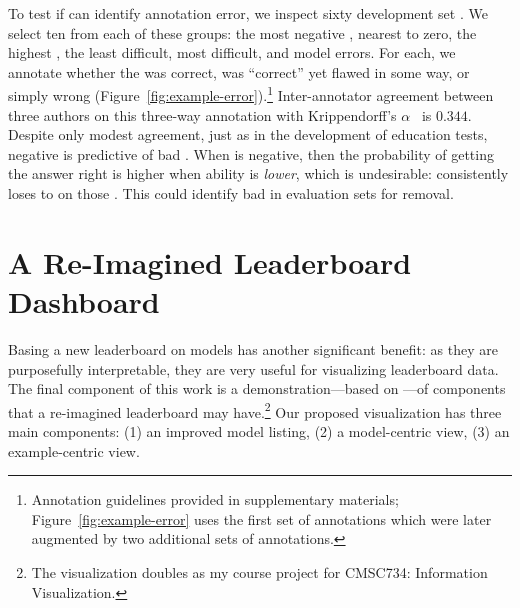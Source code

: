 To test if \irt{} can identify annotation error, we inspect sixty \squad{} development set \itms{}.
We select ten \itms{} from each of these groups: the most negative \discability{}, \discability{} nearest to zero, the highest \discability{}, the least difficult, most difficult, and \irt{} model errors.
For each, we annotate whether the \itm{} was correct, was ``correct'' yet flawed in some way, or simply wrong (Figure~\ref{fig:example-error}).\footnote{
    Annotation guidelines provided in supplementary materials; Figure~\ref{fig:example-error} uses the first set of annotations which were later augmented by two additional sets of annotations.
}
Inter-annotator agreement between three authors on this three-way annotation with Krippendorff's $\alpha$~\citep{kripp2004,artstein2008inter} is $0.344$.
Despite only modest agreement, just as in the development of education tests, negative \discability{} is predictive of bad \itms{}.
When \discability{} is negative, then the probability of getting
the answer right is higher when ability is \emph{lower}, which is
undesirable: \smart{} consistently loses to \dumb{} on those \itms{}.
This could identify bad \itms{} in evaluation sets for removal.
\begin{figure*}[t]
    \centering
    \caption{
        We annotate \squad{} \itms{} by \discability{}, \diff{}, and \irt{} prediction errors.
        For example, one question with negative \discability{} was classified as ``Wrong'' with the explanation that the annotated answer indicates it is  answerable, but the question actually  answerable.
        \Itms{} with negative \discability{} or where \irt{}'s prediction is wrong have a much higher rate of annotation error (``Flawed'' or ``Wrong'').
        Using similar methodology, errors in datasets could be more rapidly identified.
    }
    \label{fig:example-error}
\end{figure*}
\section{A Re-Imagined Leaderboard Dashboard}
\label{ch:isicle:vis}

Basing a new leaderboard on \irt{} models has another significant benefit: as they are purposefully interpretable, they are very useful for visualizing leaderboard data.
The final component of this work is a demonstration---based on \squad{}---of components that a re-imagined leaderboard may have.\footnote{
    The visualization doubles as my course project for CMSC734: Information Visualization.
}
Our proposed visualization has three main components: (1) an improved model listing, (2) a model-centric view, (3) an example-centric view.

